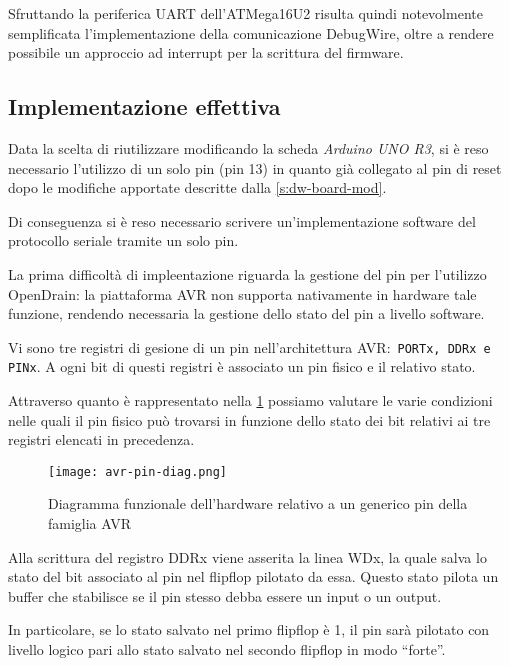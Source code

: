 Sfruttando la periferica UART dell'ATMega16U2 risulta quindi notevolmente semplificata l'implementazione della comunicazione DebugWire, oltre a rendere possibile un approccio ad interrupt per la scrittura del firmware.

\subsection{Implementazione effettiva}

Data la scelta di riutilizzare modificando la scheda \textit{Arduino UNO R3}, si è reso necessario l'utilizzo di un solo pin (pin 13) in quanto già collegato al pin di reset dopo le modifiche apportate descritte dalla \cref{s:dw-board-mod}.

Di conseguenza si è reso necessario scrivere un'implementazione software del protocollo seriale tramite un solo pin.

La prima difficoltà di impleentazione riguarda la gestione del pin per l'utilizzo OpenDrain: la piattaforma AVR non supporta nativamente in hardware tale funzione, rendendo necessaria la gestione dello stato del pin a livello software.

Vi sono tre registri di gesione di un pin nell'architettura AVR:\ \texttt{PORTx, DDRx e PINx}. A ogni bit di questi registri è associato un pin fisico e il relativo stato.

Attraverso quanto è rappresentato nella \cref{fig:avr-pin} possiamo valutare le varie condizioni nelle quali il pin fisico può trovarsi in funzione dello stato dei bit relativi ai tre registri elencati in precedenza.

\begin{figure}[t]
    \centering
    \texttt{[image: avr-pin-diag.png]}
    \caption[Immagine ottenuta dal documento\cite{avr:m16u2}, fig. 12-2]{Diagramma funzionale dell'hardware relativo a un generico pin della famiglia AVR\cite[fig. 12-2]{avr:m16u2}}\label{fig:avr-pin}
\end{figure}

Alla scrittura del registro DDRx viene asserita la linea WDx, la quale salva lo stato del bit associato al pin nel flipflop pilotato da essa. Questo stato pilota un buffer che stabilisce se il pin stesso debba essere un input o un output.

In particolare, se lo stato salvato nel primo flipflop è 1, il pin sarà pilotato con livello logico pari allo stato salvato nel secondo flipflop in modo ``forte''.

